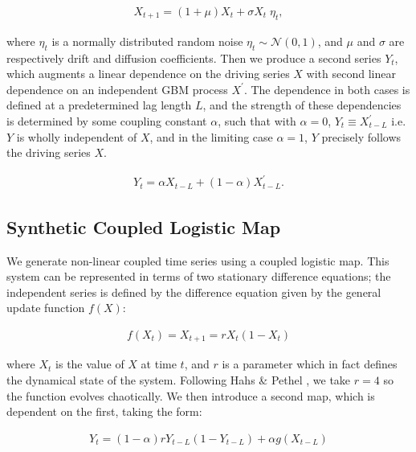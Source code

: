 \documentclass[]{rsos}%
\begin{document}
  \begin{eqnarray}
      \label{eq:GBM}
      X_{t+1} = (1+\mu) X_t + \sigma X_t \; \eta_t ,
  \end{eqnarray}

  where $\eta_t$ is a normally distributed random noise  $\eta_t \sim \mathcal{N}(0,1)$, and $\mu$ and $\sigma$ are respectively drift and diffusion coefficients. Then we produce a second series $Y_t$, which augments a linear dependence on the driving series $X$ with second linear dependence on an independent GBM process $X^{\prime}$. The dependence in both cases is defined at a predetermined lag length $L$, and the strength of these dependencies is determined by some coupling constant $\alpha$, such that with $\alpha=0$, $Y_{t} \equiv X^{\prime}_{t-L}$ i.e. $Y$ is wholly independent of $X$, and in the limiting case $\alpha=1$, $Y$ precisely follows the driving series $X$.

  \begin{eqnarray}
    \label{eq:coupled_random_walk}
    Y_{t} =  \alpha X_{t-L} + (1-\alpha) X^{\prime}_{t-L} .
  \end{eqnarray}

  

  \subsection{Synthetic Coupled Logistic Map}\label{s.NonLinearSignal}
  We generate non-linear coupled time series using a coupled logistic map. This system can be represented in terms of two stationary difference equations; the independent series is defined by the difference equation given by the general update function $f(X)$:

  \begin{eqnarray}
    f(X_t) = X_{t+1} = rX_t(1-X_t)    
    \label{eq:f(x)}
  \end{eqnarray}

  where $X_t$ is the value of $X$ at time $t$, and $r$ is a parameter which in fact defines the dynamical state of the system. {\color{black}Following Hahs \& Pethel \cite{hahs2011distinguishing}, we take $r=4$ so the function evolves chaotically.} We then introduce a second map, which is dependent on the first, taking the form:

  \begin{eqnarray}
    Y_{t} = (1-\alpha) rY_{t-L}(1-Y_{t-L})  + \alpha g(X_{t-L})   
    \label{eq:coupled_map}
  \end{eqnarray}
\end{document}
